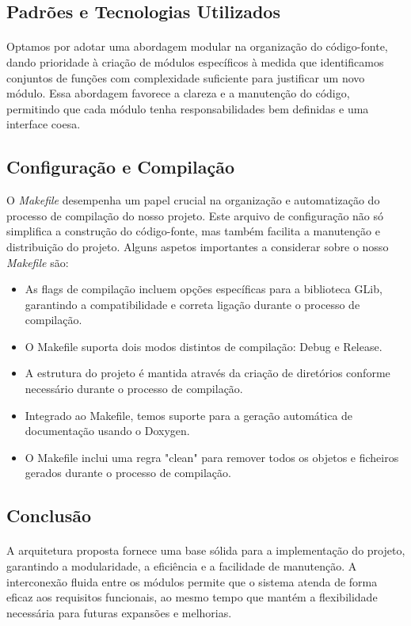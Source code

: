 \documentclass{article}
\begin{document}
\subsection{Padrões e Tecnologias Utilizados}
\paragraph{}Optamos por adotar uma abordagem modular na organização do código-fonte, dando prioridade à criação de módulos específicos à medida que identificamos conjuntos de funções com complexidade suficiente para justificar um novo módulo. Essa abordagem favorece a clareza e a manutenção do código, permitindo que cada módulo tenha responsabilidades bem definidas e uma interface coesa.

\subsection{Configuração e Compilação}
O \textit{Makefile} desempenha um papel crucial na organização e automatização do processo de compilação do nosso projeto. Este arquivo de configuração não só simplifica a construção do código-fonte, mas também facilita a manutenção e distribuição do projeto.
Alguns aspetos importantes a considerar sobre o nosso \textit{Makefile} são:
\begin{itemize}
\vspace{-0.2cm}
\item As flags de compilação incluem opções específicas para a biblioteca GLib, garantindo a compatibilidade e correta ligação durante o processo de compilação.
\item O Makefile suporta dois modos distintos de compilação: Debug e Release.
\item A estrutura do projeto é mantida através da criação de diretórios conforme necessário durante o processo de compilação.
\item Integrado ao Makefile, temos suporte para a geração automática de documentação usando o Doxygen.
\item O Makefile inclui uma regra "clean" para remover todos os objetos e ficheiros gerados durante o processo de compilação.
\end{itemize}

\subsection{Conclusão}
\paragraph{}A arquitetura proposta fornece uma base sólida para a implementação do projeto, garantindo a modularidade, a eficiência e a facilidade de manutenção. A interconexão fluida entre os módulos permite que o sistema atenda de forma eficaz aos requisitos funcionais, ao mesmo tempo que mantém a flexibilidade necessária para futuras expansões e melhorias.
\end{document}
